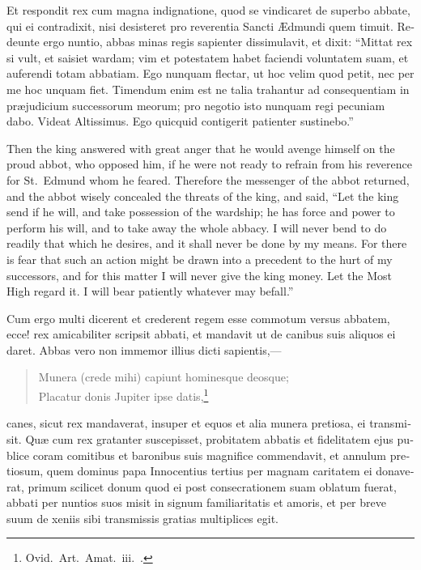 \documentclass{book}
\begin{document}
\begin{paracol}{2}
\switchcolumn*

\begin{otherlanguage}{latin}
Et respondit rex cum magna indignatione, quod se vindicaret de superbo abbate, qui ei contradixit, nisi desisteret pro reverentia Sancti \AE{}dmundi quem timuit. Redeunte ergo nuntio, abbas minas regis sapienter dissimulavit, et dixit: ``Mittat rex si vult, et saisiet wardam; vim et potestatem habet faciendi voluntatem suam, et auferendi totam abbatiam. Ego nunquam flectar, ut hoc velim quod petit, nec per me hoc unquam fiet. Timendum enim est ne talia trahantur ad consequentiam in pr\ae{}judicium successorum meorum; pro negotio isto nunquam regi pecuniam dabo. Videat Altissimus. Ego quicquid contigerit patienter sustinebo.''
\end{otherlanguage}

\switchcolumn

Then the king answered with great anger that he would avenge himself on the proud abbot, who opposed him, if he were not ready to refrain from his reverence for St.\ Edmund whom he feared. Therefore the messenger of the abbot returned, and the abbot wisely concealed the threats of the king, and said, ``Let the king send if he will, and take possession of the wardship; he has force and power to perform his will, and to take away the whole abbacy. I will never bend to do readily that which he desires, and it shall never be done by my means. For there is fear that such an action might be drawn into a precedent to the hurt of my successors, and for this matter I will never give the king money. Let the Most High regard it. I will bear patiently whatever may befall.''

\switchcolumn*

\begin{otherlanguage}{latin}
Cum ergo multi dicerent et crederent regem esse commotum versus abbatem, ecce! rex amicabiliter scripsit abbati, et mandavit ut de canibus suis aliquos ei daret. Abbas vero non immemor illius dicti sapientis,---
\vspace{-.2cm}
\begin{verse}
{\footnotesize
Munera (crede mihi) capiunt hominesque deosque;\\
Placatur donis Jupiter ipse datis,\footnote[\textdagger]{Ovid.\ Art.\ Amat.\ iii.\ .}
}
\end{verse}
\vspace{-.2cm}
canes, sicut rex mandaverat, insuper et equos et alia munera pretiosa, ei transmisit. Qu\ae{} cum rex gratanter suscepisset, probitatem abbatis et fidelitatem ejus publice coram comitibus et baronibus suis magnifice commendavit, et annulum pretiosum, quem dominus papa Innocentius tertius per magnam caritatem ei donaverat, primum scilicet donum quod ei post consecrationem suam oblatum fuerat, abbati per nuntios suos misit in signum familiaritatis et amoris, et per breve suum de xeniis sibi transmissis gratias multiplices egit.
\end{otherlanguage}


\end{paracol}
\end{document}
